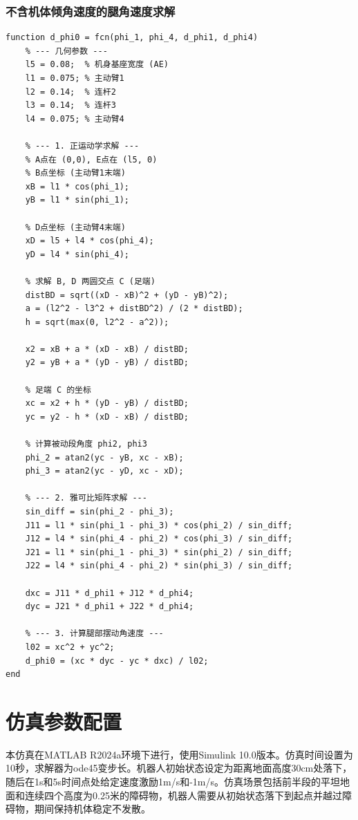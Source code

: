 \documentclass[
  oneside,
  degree=bachelor,
  fullwidthstop=false,
  fontset=fandol,
  times=false,
  minted=true,
  biblatex=true,
]{tongjithesis}
\begin{document}
\subsubsection{不含机体倾角速度的腿角速度求解}

\begin{verbatim}
function d_phi0 = fcn(phi_1, phi_4, d_phi1, d_phi4)
    % --- 几何参数 ---
    l5 = 0.08;  % 机身基座宽度 (AE)
    l1 = 0.075; % 主动臂1
    l2 = 0.14;  % 连杆2
    l3 = 0.14;  % 连杆3
    l4 = 0.075; % 主动臂4

    % --- 1. 正运动学求解 ---
    % A点在 (0,0), E点在 (l5, 0)
    % B点坐标 (主动臂1末端)
    xB = l1 * cos(phi_1);
    yB = l1 * sin(phi_1);
    
    % D点坐标 (主动臂4末端)
    xD = l5 + l4 * cos(phi_4);
    yD = l4 * sin(phi_4);

    % 求解 B, D 两圆交点 C (足端)
    distBD = sqrt((xD - xB)^2 + (yD - yB)^2);
    a = (l2^2 - l3^2 + distBD^2) / (2 * distBD);
    h = sqrt(max(0, l2^2 - a^2));
    
    x2 = xB + a * (xD - xB) / distBD;
    y2 = yB + a * (yD - yB) / distBD;
    
    % 足端 C 的坐标 
    xc = x2 + h * (yD - yB) / distBD;
    yc = y2 - h * (xD - xB) / distBD;

    % 计算被动段角度 phi2, phi3
    phi_2 = atan2(yc - yB, xc - xB);
    phi_3 = atan2(yc - yD, xc - xD);

    % --- 2. 雅可比矩阵求解 ---
    sin_diff = sin(phi_2 - phi_3);
    J11 = l1 * sin(phi_1 - phi_3) * cos(phi_2) / sin_diff; 
    J12 = l4 * sin(phi_4 - phi_2) * cos(phi_3) / sin_diff;
    J21 = l1 * sin(phi_1 - phi_3) * sin(phi_2) / sin_diff;
    J22 = l4 * sin(phi_4 - phi_2) * sin(phi_3) / sin_diff;
    
    dxc = J11 * d_phi1 + J12 * d_phi4;
    dyc = J21 * d_phi1 + J22 * d_phi4;

    % --- 3. 计算腿部摆动角速度 ---
    l02 = xc^2 + yc^2;    
    d_phi0 = (xc * dyc - yc * dxc) / l02;
end
\end{verbatim}

\section{仿真参数配置}

本仿真在MATLAB R2024a环境下进行，使用Simulink 10.0版本。仿真时间设置为10秒，求解器为ode45变步长。机器人初始状态设定为距离地面高度30cm处落下，随后在1s和5s时间点处给定速度激励1m/s和-1m/s。仿真场景包括前半段的平坦地面和连续四个高度为0.25米的障碍物，机器人需要从初始状态落下到起点并越过障碍物，期间保持机体稳定不发散。
\end{document}
